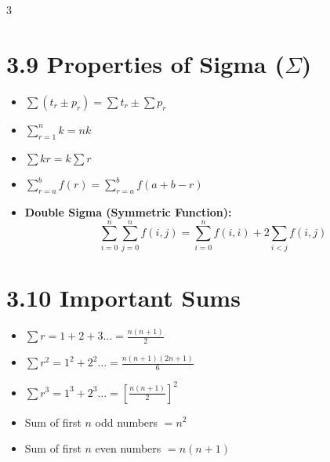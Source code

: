 \documentclass[11pt,a4paper,landscape]{article}
\begin{document}
\begin{multicols*}{3}
\section*{3.9 Properties of Sigma ($\Sigma$)}
\begin{itemize}
\item $\sum (t_r \pm p_r) = \sum t_r \pm \sum p_r$
\item $\sum_{r=1}^n k = nk$
\item $\sum kr = k \sum r$
\item $\sum_{r=a}^b f(r) = \sum_{r=a}^b f(a+b-r)$
\item \textbf{Double Sigma (Symmetric Function):}
$$ \sum_{i=0}^n \sum_{j=0}^n f(i,j) = \sum_{i=0}^n f(i,i) + 2\sum_{i<j} f(i,j) $$
\end{itemize}

\section*{3.10 Important Sums}
\begin{itemize}
\item $\sum r = 1+2+3\dots = \frac{n(n+1)}{2}$
\item $\sum r^2 = 1^2+2^2\dots = \frac{n(n+1)(2n+1)}{6}$
\item $\sum r^3 = 1^3+2^3\dots = \left[\frac{n(n+1)}{2}\right]^2$
\item Sum of first $n$ odd numbers $= n^2$
\item Sum of first $n$ even numbers $= n(n+1)$
\end{itemize}

\end{multicols*}
\end{document}

